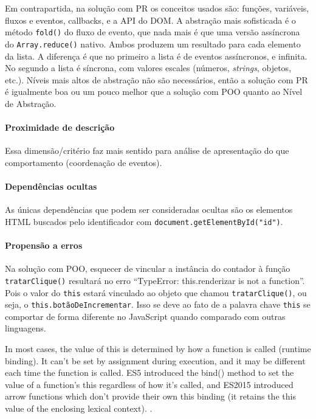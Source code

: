 Em contrapartida, na solução com PR os conceitos usados são: funções,
variáveis, fluxos e eventos, callbacks, e a API do DOM.
A abstração mais sofisticada é o método \texttt{fold()} do fluxo de evento,
que nada mais é que uma versão assíncrona do \texttt{Array.reduce()} nativo.
Ambos produzem um resultado para cada elemento da lista.
A diferença é que no primeiro a lista é de eventos assíncronos, e infinita.
No segundo a lista é síncrona, com valores escales (números, \emph{strings},
objetos, etc.).
Níveis mais altos de abstração não são necessários, então a solução com PR
é igualmente boa ou um pouco melhor que a solução com POO quanto ao Nível
de Abstração.


\paragraph{Proximidade de descrição}
\label{sec:org5f6e2d7}
Essa dimensão/critério faz mais sentido para análise de apresentação do que
comportamento (coordenação de eventos).

\paragraph{Dependências ocultas}
\label{sec:orgf233411}
As únicas dependências que podem ser consideradas ocultas são os elementos
HTML buscados pelo identificador com \texttt{document.getElementById("id")}.

\paragraph{Propensão a erros}
\label{sec:orgad59c50}
Na solução com POO, esquecer de vincular a instância do contador à função
\texttt{tratarClique()} resultará no erro “TypeError: this.renderizar is not a
function”.
Pois o valor do \texttt{this} estará vinculado ao objeto que chamou
\texttt{tratarClique()}, ou seja, o \texttt{this.botãoDeIncrementar}.
Isso se deve ao fato de a palavra chave \texttt{this} se comportar de forma
diferente no JavaScript quando comparado com outras linguagens.

\begin{citacao}
In most cases, the value of this is determined by how a function is called
(runtime binding). It can't be set by assignment during execution, and it
may be different each time the function is called. ES5 introduced the
bind() method to set the value of a function's this regardless of how it's
called, and ES2015 introduced arrow functions which don't provide their own
this binding (it retains the this value of the enclosing lexical context).
\cite{This2020}.
\end{citacao}

